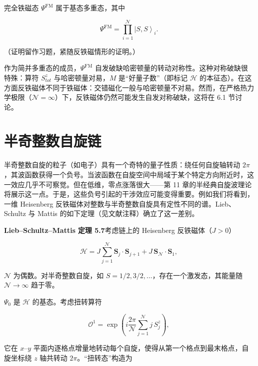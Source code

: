 完全铁磁态 $\Psi^{\mathrm{FM}}$ 属于基态多重态，其中

\begin{equation*}
\Psi^ {\mathrm{FM}} = \prod_ {i = 1} ^ {\mathcal {N}} \left| S, S \right\rangle_ {i}.
\tag{5.37}
\end{equation*}
\medskip

（证明留作习题，紧随反铁磁情形的证明。）

作为简并多重态的成员，$\Psi^{\mathrm{FM}}$ 自发破缺哈密顿量的转动对称性。这种对称破缺很特殊：算符 $S_{tot}^{z}$ 与哈密顿量对易，$M$ 是“好量子数”（即标记 $\mathcal{H}$ 的本征态）。在这方面反铁磁体不同于铁磁体：交错磁化一般与哈密顿量不对易。然而，在严格热力学极限（$\mathcal{N} = \infty$）下，反铁磁体仍然可能发生自发对称破缺，这将在 6.1 节讨论。

\section{半奇整数自旋链}

半奇整数自旋的粒子（如电子）具有一个奇特的量子性质：绕任何自旋轴转动 $2\pi$，其波函数获得一个负号。当波函数在自旋空间中局域于某个特定方向附近时，这一效应几乎不可察觉。但在低维，零点涨落很大——第 11 章的半经典自旋波理论将展示这一点。于是，这些负号引起的干涉效应可能变得重要。例如我们将看到，一维 Heisenberg 反铁磁体对整数与半奇整数自旋具有定性不同的谱。Lieb、Schultz 与 Mattis 的如下定理（见文献注释）确立了这一差别。

\medskip
\noindent\textbf{Lieb--Schultz--Mattis 定理 5.7}\quad 考虑链上的 Heisenberg 反铁磁体（$J > 0$）

\begin{equation*}
\mathcal {H} = J \sum_ {j = 1} ^ {\mathcal {N}} \mathbf {S} _ {j} \cdot \mathbf {S} _ {j + 1} + J \, \mathbf {S} _ {\mathcal {N}} \cdot \mathbf {S} _ {1} ,
\tag{5.38}
\end{equation*}

$\mathcal{N}$ 为偶数。对半奇整数自旋，如 $S = 1/2, 3/2, \ldots$，存在一个激发态，其能量随 $\mathcal{N} \to \infty$ 趋于零。
\medskip

$\Psi_0$ 是 $\mathcal{H}$ 的基态。考虑扭转算符

\begin{equation*}
\mathcal {O} ^ {1} = \exp \left( i \frac {2 \pi}{\mathcal {N}} \sum_ {j = 1} ^ {\mathcal {N}} j \, S _ {j} ^ {z} \right),
\tag{5.39}
\end{equation*}

它在 $x$--$y$ 平面内逐格点增量地转动每个自旋，使得从第一个格点到最末格点，自旋坐标绕 $z$ 轴共转动 $2\pi$。“扭转态”构造为

